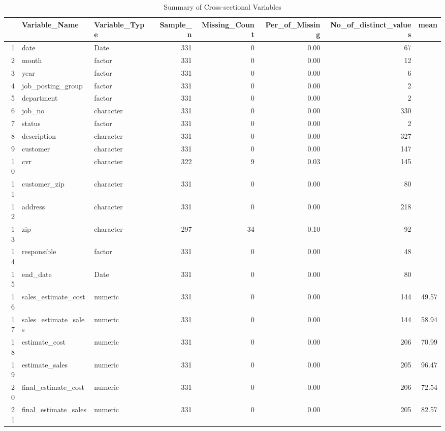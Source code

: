 \begin{sidewaystable}[ht]
\centering
\caption{Summary of Cross-sectional Variables} 
\begin{tabular}{rllrrrrr}
  \hline
 & Variable\_Name & Variable\_Type & Sample\_n & Missing\_Count & Per\_of\_Missing & No\_of\_distinct\_values & mean \\ 
  \hline
1 & date & Date & 331 &   0 & 0.00 &  67 &  \\ 
  2 & month & factor & 331 &   0 & 0.00 &  12 &  \\ 
  3 & year & factor & 331 &   0 & 0.00 &   6 &  \\ 
  4 & job\_posting\_group & factor & 331 &   0 & 0.00 &   2 &  \\ 
  5 & department & factor & 331 &   0 & 0.00 &   2 &  \\ 
  6 & job\_no & character & 331 &   0 & 0.00 & 330 &  \\ 
  7 & status & factor & 331 &   0 & 0.00 &   2 &  \\ 
  8 & description & character & 331 &   0 & 0.00 & 327 &  \\ 
  9 & customer & character & 331 &   0 & 0.00 & 147 &  \\ 
  10 & cvr & character & 322 &   9 & 0.03 & 145 &  \\ 
  11 & customer\_zip & character & 331 &   0 & 0.00 &  80 &  \\ 
  12 & address & character & 331 &   0 & 0.00 & 218 &  \\ 
  13 & zip & character & 297 &  34 & 0.10 &  92 &  \\ 
  14 & responsible & factor & 331 &   0 & 0.00 &  48 &  \\ 
  15 & end\_date & Date & 331 &   0 & 0.00 &  80 &  \\ 
  16 & sales\_estimate\_cost & numeric & 331 &   0 & 0.00 & 144 & 49.57 \\ 
  17 & sales\_estimate\_sales & numeric & 331 &   0 & 0.00 & 144 & 58.94 \\ 
  18 & estimate\_cost & numeric & 331 &   0 & 0.00 & 206 & 70.99 \\ 
  19 & estimate\_sales & numeric & 331 &   0 & 0.00 & 205 & 96.47 \\ 
  20 & final\_estimate\_cost & numeric & 331 &   0 & 0.00 & 206 & 72.54 \\ 
  21 & final\_estimate\_sales & numeric & 331 &   0 & 0.00 & 205 & 82.57 \\ 

\end{tabular}
\end{sidewaystable}
